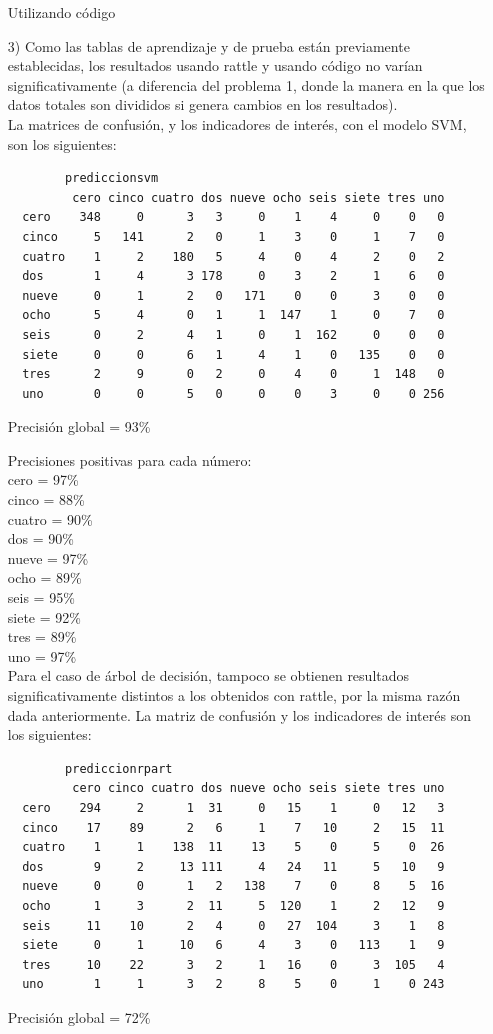 \documentclass[11pt,a4paper]{report}
\begin{document}
\begin{itemize}
\begin{center}
 Utilizando código
\end{center}
\item[3)]
Como las tablas de aprendizaje y de prueba están previamente establecidas, los resultados usando rattle y usando código no varían significativamente (a diferencia del problema 1, donde la manera en la que los datos totales son divididos si genera cambios en los resultados). \\
La matrices de confusión, y los indicadores de interés, con el modelo SVM, son los siguientes:
\begin{verbatim}
        prediccionsvm
         cero cinco cuatro dos nueve ocho seis siete tres uno
  cero    348     0      3   3     0    1    4     0    0   0
  cinco     5   141      2   0     1    3    0     1    7   0
  cuatro    1     2    180   5     4    0    4     2    0   2
  dos       1     4      3 178     0    3    2     1    6   0
  nueve     0     1      2   0   171    0    0     3    0   0
  ocho      5     4      0   1     1  147    1     0    7   0
  seis      0     2      4   1     0    1  162     0    0   0
  siete     0     0      6   1     4    1    0   135    0   0
  tres      2     9      0   2     0    4    0     1  148   0
  uno       0     0      5   0     0    0    3     0    0 256
\end{verbatim}
Precisión global = 93\% 

Precisiones positivas para cada número: \\
cero = 97\%\\
cinco = 88\%\\
cuatro = 90\%\\
dos = 90\%\\
nueve = 97\%\\
ocho = 89\%\\
seis = 95\%\\
siete = 92\%\\
tres = 89\%\\
uno = 97\%\\

Para el caso de árbol de decisión, tampoco se obtienen resultados significativamente distintos a los obtenidos con rattle, por la misma razón dada anteriormente. La matriz de confusión y los indicadores de interés son los siguientes:

\begin{verbatim}
        prediccionrpart
         cero cinco cuatro dos nueve ocho seis siete tres uno
  cero    294     2      1  31     0   15    1     0   12   3
  cinco    17    89      2   6     1    7   10     2   15  11
  cuatro    1     1    138  11    13    5    0     5    0  26
  dos       9     2     13 111     4   24   11     5   10   9
  nueve     0     0      1   2   138    7    0     8    5  16
  ocho      1     3      2  11     5  120    1     2   12   9
  seis     11    10      2   4     0   27  104     3    1   8
  siete     0     1     10   6     4    3    0   113    1   9
  tres     10    22      3   2     1   16    0     3  105   4
  uno       1     1      3   2     8    5    0     1    0 243
\end{verbatim}
Precisión global = 72\%


\end{itemize}
\end{document}
